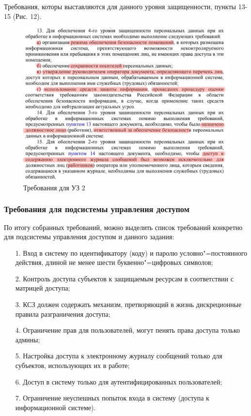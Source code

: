 Требования, которы выставляются для данного уровня защищенности, пункты 13-15 (Рис. 12). 

\begin{figure}[H]
  \centering
  \includegraphics[width=1\textwidth]{pict/5}
  \caption{Требования для УЗ 2}
  \label{fig:5}
\end{figure}

\subsubsection{Требования для подсистемы управления доступом}
По итогу собранных требований, можно выделить список требований конкретно для
подсистемы управления доступом и данного задания:

\begin{itemize}
  \item[1.] Вход в систему по идентификатору (коду) и паролю условно"=постоянного действия, длиной не менее шести буквенно"=цифровых символов;
  \item[2.] Контроль доступа субъектов к защищаемым ресурсам в соответствии с матрицей доступа;
  \item[3.] КСЗ должен содержать механизм, претворяющий в жизнь дискреционные
  правила разграничения доступа;
  \item[4.] Ограничение прав для пользователей, могут пенять права доступа только админы;
  \item[5.] Настройка доступа к электронному журналу сообщений только для субъектов, использующих их в работе;
  \item[6.] Доступ в систему только для аутентифицированных пользователей; 
  \item[7.] Ограничение неуспешных попыток входа в систему (доступа к информационной системе). 
\end{itemize}\newpage






